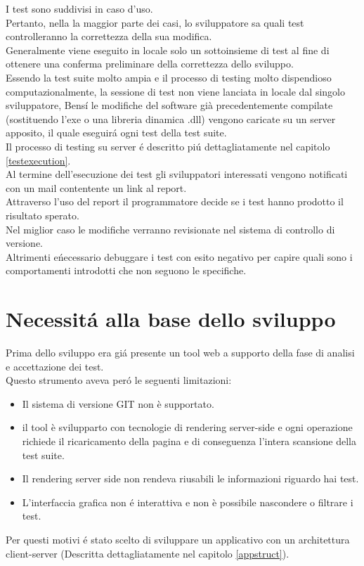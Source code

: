         I test sono suddivisi in caso d'uso.\\
        Pertanto, nella la maggior parte dei casi, lo sviluppatore sa quali test  controlleranno la correttezza della sua modifica.\\
        Generalmente viene eseguito in locale solo un sottoinsieme di test al fine di ottenere una conferma preliminare della correttezza dello sviluppo.\\

        Essendo la test suite molto ampia e il processo di testing molto dispendioso computazionalmente, 
        la sessione di test non viene lanciata in locale dal singolo sviluppatore, 
        Bens\'i  le modifiche del software già precedentemente compilate (sostituendo l’exe o una libreria dinamica .dll) 
        vengono caricate su un server apposito, il quale eseguir\'a ogni test della test suite.\\

        Il processo di testing su server \'e descritto pi\'u dettagliatamente nel capitolo \ref{testexecution}.\\
        
        Al termine dell'esecuzione dei test gli sviluppatori interessati vengono notificati con un mail contentente un link al report.\\
        Attraverso l'uso del report il programmatore decide se i test hanno prodotto il risultato sperato.\\
        Nel miglior caso le modifiche verranno revisionate nel sistema di controllo di versione.\\
        Altrimenti e\' necessario debuggare i test con esito negativo per capire quali sono i comportamenti introdotti che non seguono le specifiche. \\

    \section{Necessit\'a alla base dello sviluppo}
        Prima dello sviluppo era gi\'a presente un tool web a supporto della fase di analisi e accettazione dei test.\\
        Questo strumento aveva per\'o le seguenti limitazioni:\\
        \begin{itemize}
            \item Il sistema di versione GIT non è supportato.
            \item il tool è svilupparto con tecnologie di rendering server-side e ogni operazione richiede il ricaricamento della pagina e di conseguenza l'intera scansione della test suite.
            \item Il rendering server side non rendeva riusabili le informazioni riguardo hai test.
            \item L'interfaccia grafica non \'e interattiva e non è possibile nascondere o filtrare i test.
        \end{itemize}

        Per questi motivi \'e stato scelto di sviluppare un applicativo con un architettura client-server (Descritta dettagliatamente nel capitolo \ref{appstruct}).